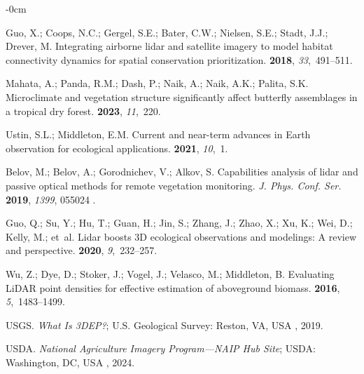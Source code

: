 \documentclass[remotesensing,article,accept,pdftex,moreauthors]{Definitions/mdpi}
\renewcommand{\hl}[1]{#1}
\begin{document}
\begin{adjustwidth}{-\extralength}{0cm}
\begin{thebibliography}{999}
Guo, X.; Coops, N.C.; Gergel, S.E.; Bater, C.W.; Nielsen, S.E.; Stadt, J.J.;
  Drever, M.
\newblock Integrating airborne lidar and satellite imagery to model habitat
  connectivity dynamics for spatial conservation prioritization.
 {\bf 2018}, {\em 33},~491--511.

Mahata, A.; Panda, R.M.; Dash, P.; Naik, A.; Naik, A.K.; Palita, S.K.
\newblock Microclimate and vegetation structure significantly affect butterfly
  assemblages in a tropical dry forest.
 {\bf 2023}, {\em 11},~220.

Ustin, S.L.; Middleton, E.M.
\newblock Current and near-term advances in Earth observation for ecological
  applications.
 {\bf 2021}, {\em 10},~1.

Belov, M.; Belov, A.; Gorodnichev, V.; Alkov, S.
\newblock Capabilities analysis of lidar and passive optical methods for remote
  vegetation monitoring.
\newblock \emph{J. Phys. Conf. Ser.} \textbf{2019}, \emph{1399}, \hl{055024}%
.

Guo, Q.; Su, Y.; Hu, T.; Guan, H.; Jin, S.; Zhang, J.; Zhao, X.; Xu, K.; Wei,
  D.; Kelly, M.;  et~al.
\newblock Lidar boosts 3D ecological observations and modelings: A review and
  perspective.
 {\bf 2020}, {\em
  9},~232--257.

Wu, Z.; Dye, D.; Stoker, J.; Vogel, J.; Velasco, M.; Middleton, B.
\newblock Evaluating LiDAR point densities for effective estimation of
  aboveground biomass.
 {\bf
  2016}, {\em 5},~1483--1499.

USGS.
\newblock \emph{What Is {3DEP}?}; U.S. Geological Survey: \hl{Reston, VA, USA}%
, 2019.

USDA.
\newblock \emph{National Agriculture Imagery Program---NAIP Hub Site}; \hl{USDA: Washington, DC, USA}%
, 2024.


\end{thebibliography}
\end{adjustwidth}
\end{document}
